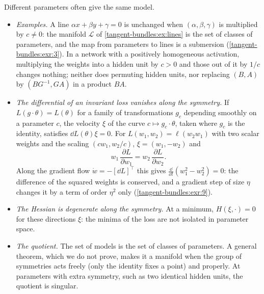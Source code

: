 \begin{notechapter}
\begin{mlthread}
Different parameters often give the same model.
\begin{itemize}[nosep]
  \item \emph{Examples.} A line $\alpha x + \beta y + \gamma = 0$ is
        unchanged when $(\alpha, \beta, \gamma)$ is multiplied by
        $c\neq0$: the manifold $\mathcal L$ of
        \cref{tangent-bundles:ex:lines} is the set of classes of
        parameters, and the map from parameters to lines is a submersion
        (\cref{tangent-bundles:exr:3}). In a network with a positively
        homogeneous activation, multiplying the weights into a hidden
        unit by $c > 0$ and those out of it by $1/c$ changes nothing;
        neither does permuting hidden units, nor replacing $(B, A)$ by
        $(BG^{-1}, GA)$ in a product $BA$.
  \item \emph{The differential of an invariant loss vanishes along the
        symmetry.} If $L(g\cdot\theta) = L(\theta)$ for a family of
        transformations $g_c$ depending smoothly on a parameter $c$,
        the velocity $\xi$ of the curve $c\mapsto g_c\cdot\theta$, taken
        where $g_c$ is the identity, satisfies $\dd L(\theta)\xi = 0$.
        For $L(w_1, w_2) = \ell(w_2w_1)$ with two scalar weights and the
        scaling $(cw_1, w_2/c)$, $\xi = (w_1, -w_2)$ and
        \[
          w_1\,\frac{\partial L}{\partial w_1}
          = w_2\,\frac{\partial L}{\partial w_2} .
        \]
        Along the gradient flow $\dot w = -[\dd L]^\top$ this gives
        $\frac{\dd}{\dd t}(w_1^2 - w_2^2) = 0$: the difference of the
        squared weights is conserved, and a gradient step of size $\eta$
        changes it by a term of order $\eta^2$ only
        (\cref{tangent-bundles:exr:9}).
  \item \emph{The Hessian is degenerate along the symmetry.} At a
        minimum, $H(\xi, \cdot) = 0$ for these directions $\xi$: the
        minima of the loss are not isolated in parameter space.
  \item \emph{The quotient.} The set of models is the set of classes of
        parameters. A general theorem, which we do not prove, makes it
        a manifold when the group of symmetries acts freely (only the
        identity fixes a point) and properly. At parameters with extra
        symmetry, such as two identical hidden units, the quotient is
        singular.
\end{itemize}
\end{mlthread}


\end{notechapter}

